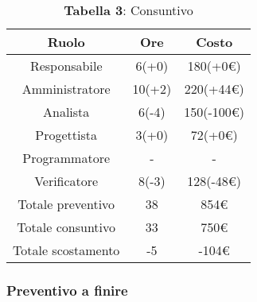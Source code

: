 \begin{table}[H]
	\centering
	\renewcommand{\arraystretch}{1.5}
	\begin{tabular}{|c|c|c|}
		\hline
		\rowcolor{lighter-grayer}
		Ruolo & Ore & Costo \\ \hline
		Responsabile & 6(+0) & 180(+0\euro) \\ \hline
		Amministratore & 10(+2) & 220(+44\euro) \\ \hline
		Analista & 6(-4) & 150(-100\euro) \\ \hline
		Progettista & 3(+0) & 72(+0\euro) \\ \hline
		Programmatore & - & - \\ \hline
		Verificatore & 8(-3) & 128(-48\euro) \\ \hline
		Totale preventivo & 38 & 854\euro \\ \hline
		Totale consuntivo & 33 & 750\euro \\ \hline
		Totale scostamento & -5 & -104\euro \\ \hline
	\end{tabular}
	\caption*{\textbf{Tabella 3}: Consuntivo\\}
\end{table}

\subsubsection{Preventivo a finire}


